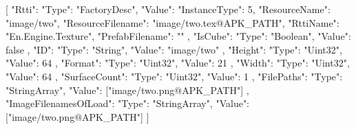 [{
        "Rtti": {
            "Type": "FactoryDesc",
            "Value": {
                "InstanceType": 5,
                "ResourceName": "image/two",
                "ResourceFilename": "image/two.tex@APK_PATH",
                "RttiName": "En.Engine.Texture",
                "PrefabFilename": ""
            }
        },
        "IsCube": {
            "Type": "Boolean",
            "Value": false
        },
        "ID": {
            "Type": "String",
            "Value": "image/two"
        },
        "Height": {
            "Type": "Uint32",
            "Value": 64
        },
        "Format": {
            "Type": "Uint32",
            "Value": 21
        },
        "Width": {
            "Type": "Uint32",
            "Value": 64
        },
        "SurfaceCount": {
            "Type": "Uint32",
            "Value": 1
        },
        "FilePaths": {
            "Type": "StringArray",
            "Value": ["image/two.png@APK_PATH"]
        },
        "ImageFilenamesOfLoad": {
            "Type": "StringArray",
            "Value": ["image/two.png@APK_PATH"]
        }
    }]